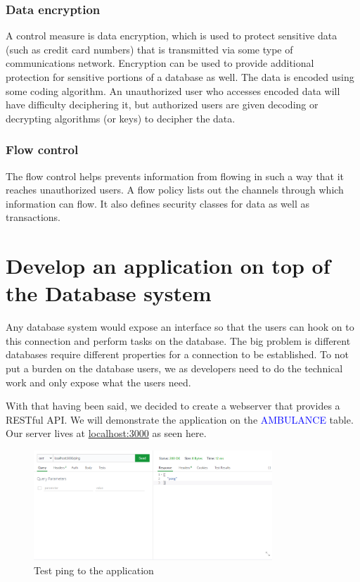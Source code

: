 \documentclass[a4paper]{article}
\numberwithin{equation}{section}
\begin{document}
\subsubsection{Data encryption}
A control measure is data encryption, which is used to protect sensitive data (such as credit card numbers) that is transmitted via some type of communications network.
Encryption can be used to provide additional protection for sensitive portions of a database as well.
The data is encoded using some coding algorithm.
An unauthorized user who accesses encoded data will have difficulty deciphering it, but authorized users are given decoding or decrypting algorithms (or keys) to decipher the data.


\subsubsection{Flow control}
The flow control helps prevents information from flowing in such a way that it reaches unauthorized users.
A flow policy lists out the channels through which information can flow.
It also defines security classes for data as well as transactions.

\newpage

\section{Develop an application on top of the Database system}
Any database system would expose an interface so that the users can hook on to this connection and perform tasks on the database.
The big problem is different databases require different properties for a connection to be established.
To not put a burden on the database users, we as developers need to do the technical work and only expose what the users need.

With that having been said, we decided to create a webserver that provides a RESTful API\@.
We will demonstrate the application on the \textcolor{blue}{AMBULANCE} table.
Our server lives at \url{localhost:3000} as seen here.
\begin{figure}[H]
  \centering
  \includegraphics[width=0.8\textwidth]{./assets/api_ping.png}
  \caption{Test ping to the application}
\end{figure}
\end{document}
